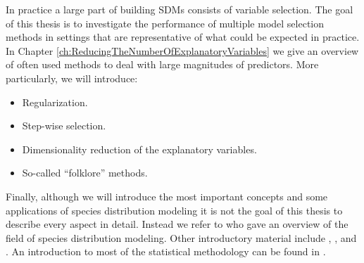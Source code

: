 In practice a large part of building SDMs consists of variable selection. The goal of this thesis is to investigate the performance of multiple model selection methods in settings that are representative of what could be expected in practice. In Chapter \ref{ch:ReducingTheNumberOfExplanatoryVariables} we give an overview of often used methods to deal with large magnitudes of predictors. More particularly, we will introduce: 
\begin{itemize}
\item Regularization. 
\item Step-wise selection. 
\item Dimensionality reduction of the explanatory variables. 
\item So-called ``folklore'' methods.
\end{itemize}


Finally, although we will introduce the most important concepts and some applications of species distribution modeling it is not the goal of this thesis to describe every aspect in detail. Instead we refer to \cite{miller_modeling_2002} who gave an overview of the field of species distribution modeling. Other introductory material include
\cite{guisan_predictive_2000}, \cite{guisan_predicting_2005}, and \cite{elith_species_2009}. An introduction to most of the statistical methodology can be found in \cite{hastie_elements_2009}.






















